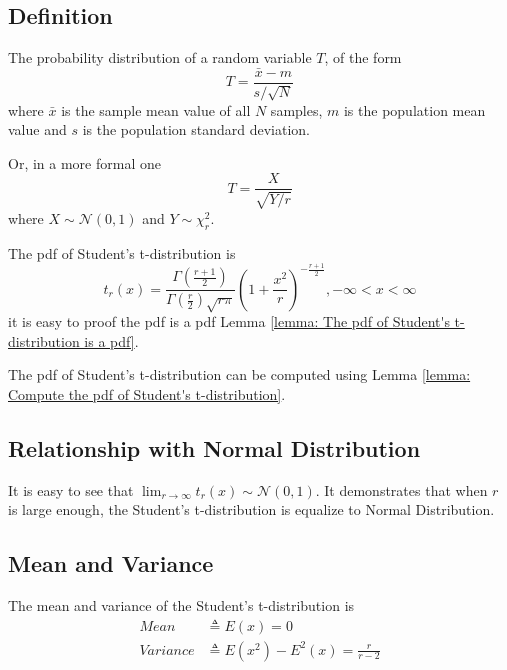 \documentclass[../main.tex]{subfiles}
\begin{document}
\subsection{Definition}

The probability distribution of a random variable $T$, of the form
\begin{equation}
    T = \frac{\bar{x} - m}{s / \sqrt{N}}
\end{equation}
where $\bar{x}$ is the sample mean value of all $N$ samples, $m$ is the population mean value and $s$ is the population standard deviation.

Or, in a more formal one
\begin{equation}
    T = \frac{X}{\sqrt{Y/r}}
\end{equation}
where $X \sim \mathcal{N}(0, 1)$ and $Y \sim \chi_r^2$.

The pdf of Student's t-distribution is
\begin{equation}
    t_r(x) = \frac{\Gamma(\frac{r+1}{2})}{\Gamma(\frac{r}{2}) \sqrt{r\pi}} (1+\frac{x^2}{r})^{-\frac{r+1}{2}}, -\infty < x < \infty
\end{equation}
it is easy to proof the pdf is a pdf Lemma \ref{lemma: The pdf of Student's t-distribution is a pdf}.

The pdf of Student's t-distribution can be computed using Lemma \ref{lemma: Compute the pdf of Student's t-distribution}.

\subsection{Relationship with Normal Distribution}

It is easy to see that $\lim_{r \to \infty} t_r(x) \sim \mathcal{N}(0, 1)$.
It demonstrates that when $r$ is large enough, the Student's t-distribution is equalize to Normal Distribution.

\subsection{Mean and Variance}

The mean and variance of the Student's t-distribution is
\begin{align*}
    Mean     & \triangleq E(x) = 0                        \\
    Variance & \triangleq E(x^2) - E^2(x) = \frac{r}{r-2}
\end{align*}
\end{document}
